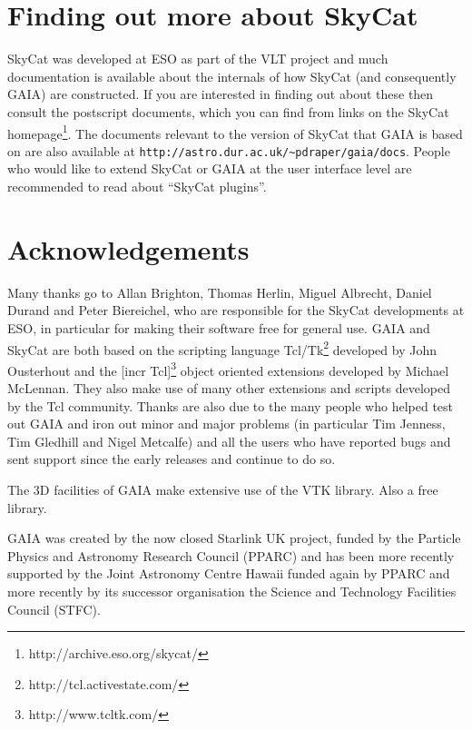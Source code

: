 \documentclass[twoside,11pt]{article}
\newcommand{\htmladdnormallinkfoot}[2]{#1\footnote{#2}}
\newcommand{\htmladdnormallink}[2]{#1}
\newcommand{\xlabel}[1]{}
\renewcommand{\_}{\texttt{\symbol{95}}}
\newcommand{\mytt}[1]{{\texttt{#1}}}
\begin{document}
\section{\xlabel{finding_out_more_about_skycat}Finding out more about SkyCat}
\htmladdnormallink{SkyCat}{http://archive.eso.org/skycat/} was
developed at \htmladdnormallink{ESO}{http://www.eso.org/} as part of
the \htmladdnormallink{VLT}{http://www.eso.org/vlt/} project and much
documentation is available about the internals of how SkyCat (and
consequently GAIA) are constructed. If you are interested in finding
out about these then consult the postscript documents, which you can
find from links on the \htmladdnormallinkfoot{SkyCat
homepage}{http://archive.eso.org/skycat/}. The documents relevant to
the version of SkyCat that GAIA is based on are also available at
\htmladdnormallink{\mytt{http://astro.dur.ac.uk/\~{}pdraper/gaia/docs}}
{http://astro.dur.ac.uk/~pdraper/gaia/docs}. People who would like
to extend SkyCat or GAIA at the user interface level are recommended
to read about ``SkyCat plugins''.


\section{\xlabel{acknowledgements}Acknowledgements}

Many thanks go to Allan Brighton, Thomas Herlin, Miguel Albrecht,
Daniel Durand and Peter Biereichel, who are responsible for the
\htmladdnormallink{SkyCat}{http://archive.eso.org/skycat/}
developments at ESO, in particular for making their software free for
general use.
GAIA and SkyCat are both based on the scripting language
\htmladdnormallinkfoot{Tcl/Tk}{http://tcl.activestate.com/} developed by
John Ousterhout and the \htmladdnormallinkfoot{[incr Tcl]}
{http://www.tcltk.com/} object oriented extensions developed by
Michael McLennan.
They also make use of many other extensions and scripts developed by
the Tcl community.
Thanks are also due to the many people who helped test out GAIA and
iron out minor and major problems (in particular Tim Jenness, Tim
Gledhill and Nigel Metcalfe) and all the users who have reported bugs
and sent support since the early releases and continue to do so.

The 3D facilities of GAIA make extensive use of the
\htmladdnormallink{VTK}{http://www.kitware.com} library. Also a free
library.

GAIA was created by the now closed Starlink UK project, funded by the Particle
Physics and Astronomy Research Council (PPARC) and has been more recently
supported by the Joint Astronomy Centre Hawaii funded again by PPARC and more
recently by its successor organisation the Science and Technology Facilities
Council (STFC).

\end{document}
